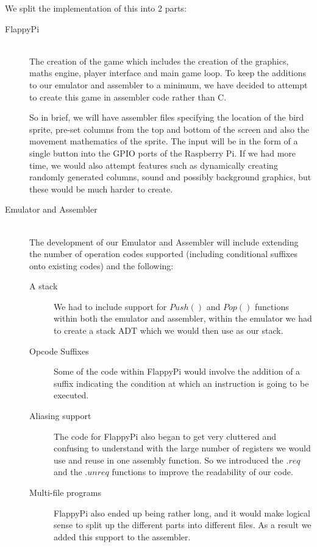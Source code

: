 \documentclass[11pt]{article}
\begin{document}
We split the implementation of this into 2 parts:
\begin{description}

\item[FlappyPi] \hfill \\
	The creation of the game which includes the creation of the graphics, maths engine, player interface and main game loop. To keep the additions to our emulator and assembler to a minimum, we have decided to attempt to create this game in assembler code rather than C.
	
	So in brief, we will have assembler files specifying the location of the bird sprite, pre-set columns from the top and bottom of the screen and also the movement mathematics of the sprite. The input will be in the form of a single button into the GPIO ports of the Raspberry Pi. If we had more time, we would also attempt features such as dynamically creating randomly generated columns, sound and possibly background graphics, but these would be much harder to create.
	

\item[Emulator and Assembler] \hfill \\
	The development of our Emulator and Assembler will include extending the number of operation codes supported (including conditional suffixes onto existing codes) and the following:
	\begin{description}
	\item[A stack]
		We had to include support for $Push()$ and $Pop()$ functions within both the emulator and assembler, within the emulator we had to create a stack ADT which we would then use as our stack.
	\item[Opcode Suffixes]
		Some of the code within FlappyPi would involve the addition of a suffix indicating the condition at which an instruction is going to be executed. 
	\item[Aliasing support] 
		The code for FlappyPi also began to get very cluttered and confusing to understand with the large number of registers we would use and reuse in one assembly function. So we introduced the $.req$ and the $.unreq$ functions to improve the readability of our code.
	\item[Multi-file programs]
		FlappyPi also ended up being rather long, and it would make logical sense to split up the different parts into different files. As a result we added this support to the assembler.
		
	\end{description}
	
\end{description}
\end{document}

